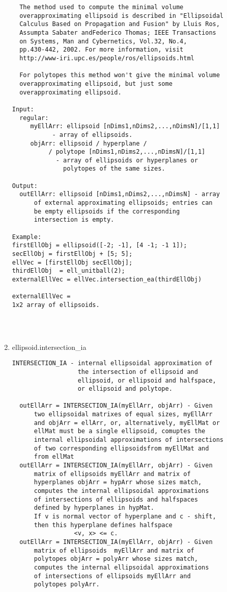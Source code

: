\begin{enumerate}
\begin{lstlisting}
  The method used to compute the minimal volume
  overapproximating ellipsoid is described in "Ellipsoidal
  Calculus Based on Propagation and Fusion" by Lluis Ros,
  Assumpta Sabater andFederico Thomas; IEEE Transactions
  on Systems, Man and Cybernetics, Vol.32, No.4,
  pp.430-442, 2002. For more information, visit
  http://www-iri.upc.es/people/ros/ellipsoids.html

  For polytopes this method won't give the minimal volume
  overapproximating ellipsoid, but just some
  overapproximating ellipsoid.

Input:
  regular:
     myEllArr: ellipsoid [nDims1,nDims2,...,nDimsN]/[1,1]
           - array of ellipsoids.
     objArr: ellipsoid / hyperplane /
          / polytope [nDims1,nDims2,...,nDimsN]/[1,1]
            - array of ellipsoids or hyperplanes or
              polytopes of the same sizes.

Output:
  outEllArr: ellipsoid [nDims1,nDims2,...,nDimsN] - array
      of external approximating ellipsoids; entries can
      be empty ellipsoids if the corresponding
      intersection is empty.

Example:
firstEllObj = ellipsoid([-2; -1], [4 -1; -1 1]);
secEllObj = firstEllObj + [5; 5];
ellVec = [firstEllObj secEllObj];
thirdEllObj  = ell_unitball(2);
externalEllVec = ellVec.intersection_ea(thirdEllObj)

externalEllVec =
1x2 array of ellipsoids.




\end{lstlisting}
\fontfamily{\familydefault}
\selectfont
\item {ellipsoid.intersection\_ia}
\selectfont
\begin{lstlisting}
INTERSECTION_IA - internal ellipsoidal approximation of
                  the intersection of ellipsoid and
                  ellipsoid, or ellipsoid and halfspace,
                  or ellipsoid and polytope.

  outEllArr = INTERSECTION_IA(myEllArr, objArr) - Given
      two ellipsoidal matrixes of equal sizes, myEllArr
      and objArr = ellArr, or, alternatively, myEllMat or
      ellMat must be a single ellipsoid, comuptes the
      internal ellipsoidal approximations of intersections
      of two corresponding ellipsoidsfrom myEllMat and
      from ellMat
  outEllArr = INTERSECTION_IA(myEllArr, objArr) - Given
      matrix of ellipsoids myEllArr and matrix of
      hyperplanes objArr = hypArr whose sizes match,
      computes the internal ellipsoidal approximations
      of intersections of ellipsoids and halfspaces
      defined by hyperplanes in hypMat.
      If v is normal vector of hyperplane and c - shift,
      then this hyperplane defines halfspace
                 <v, x> <= c.
  outEllArr = INTERSECTION_IA(myEllArr, objArr) - Given
      matrix of ellipsoids  myEllArr and matrix of
      polytopes objArr = polyArr whose sizes match,
      computes the internal ellipsoidal approximations
      of intersections of ellipsoids myEllArr and
      polytopes polyArr.


\end{lstlisting}
\end{enumerate}
